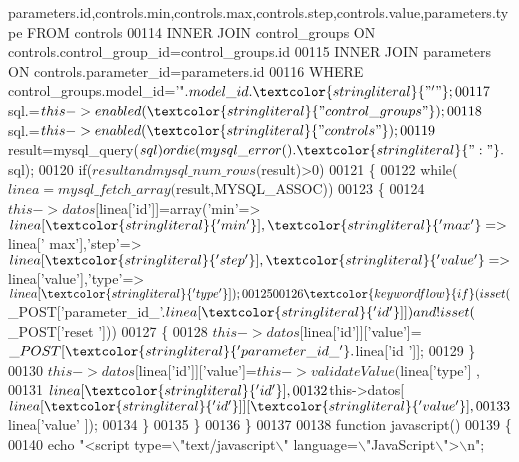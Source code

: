 \begin{DoxyCode}
{{{       parameters.id,controls.min,controls.max,controls.step,controls.value,parameters.type FROM controls }
00114 \textcolor{stringliteral}{                            INNER JOIN control\_groups ON
       controls.control\_group\_id=control\_groups.id}
00115 \textcolor{stringliteral}{                            INNER JOIN parameters ON
       controls.parameter\_id=parameters.id}
00116 \textcolor{stringliteral}{                            WHERE control\_groups.model\_id='"}.$model\_id.\textcolor{stringliteral}{"'"};
00117     $sql.=$this->enabled(\textcolor{stringliteral}{"control\_groups"});
00118     $sql.=$this->enabled(\textcolor{stringliteral}{"controls"});
00119     $result=mysql\_query($sql) or die(mysql\_error().\textcolor{stringliteral}{": "}.$sql);
00120     \textcolor{keywordflow}{if}($result and mysql\_num\_rows($result)>0)
00121     \{
00122       \textcolor{keywordflow}{while}($linea=mysql\_fetch\_array($result,MYSQL\_ASSOC))
00123       \{
00124         $this->datos[$linea[\textcolor{stringliteral}{'id'}]]=array(\textcolor{stringliteral}{'min'}=>$linea[\textcolor{stringliteral}{'min'}],\textcolor{stringliteral}{'max'}=>$linea[\textcolor{stringliteral}{'
      max'}],\textcolor{stringliteral}{'step'}=>$linea[\textcolor{stringliteral}{'step'}],\textcolor{stringliteral}{'value'}=>$linea[\textcolor{stringliteral}{'value'}],\textcolor{stringliteral}{'type'}=>$linea[\textcolor{stringliteral}{'type'}]);
00125         
00126         \textcolor{keywordflow}{if}(isset($\_POST[\textcolor{stringliteral}{'parameter\_id\_'}.$linea[\textcolor{stringliteral}{'id'}]]) and !isset($\_POST[\textcolor{stringliteral}{'reset
      '}]))
00127         \{
00128           $this->datos[$linea[\textcolor{stringliteral}{'id'}]][\textcolor{stringliteral}{'value'}]=$\_POST[\textcolor{stringliteral}{'parameter\_id\_'}.$linea[\textcolor{stringliteral}{'id
      '}]];
00129         \}
00130         $this->datos[$linea[\textcolor{stringliteral}{'id'}]][\textcolor{stringliteral}{'value'}]=$this->validateValue($linea[\textcolor{stringliteral}{'type'}]
      ,
00131                                                                  $linea[\textcolor{stringliteral}{'id'}],
00132                                                                  $this->datos[
      $linea[\textcolor{stringliteral}{'id'}]][\textcolor{stringliteral}{'value'}],
00133                                                                  $linea[\textcolor{stringliteral}{'value'}
      ]);
00134       \}
00135     \}
00136   \}
00137 
00138   \textcolor{keyword}{function} javascript()
00139   \{
00140     echo \textcolor{stringliteral}{"<script type=\(\backslash\)"text/javascript\(\backslash\)" language=\(\backslash\)"JavaScript\(\backslash\)">\(\backslash\)n"};
}}
\end{DoxyCode}
